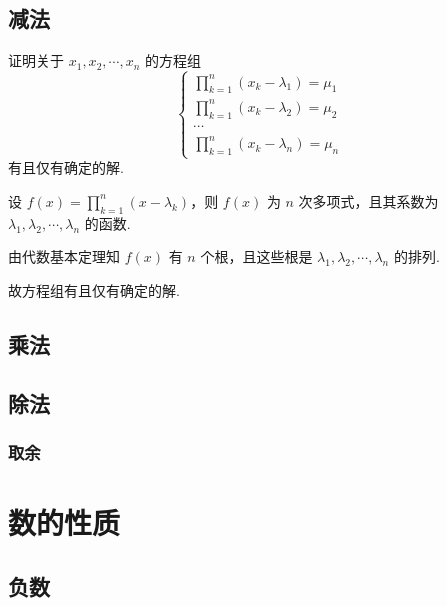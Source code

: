 \subsection{减法} \label{subsec:subtraction}

\begin{question}
  证明关于 $x_1, x_2, \cdots, x_n$ 的方程组
  \[
    \left\{
    \begin{gathered}
      \prod_{k = 1}^{n} (x_k - \lambda_1) = \mu_1 \\
      \prod_{k = 1}^{n} (x_k - \lambda_2) = \mu_2 \\
      \cdots                                      \\
      \prod_{k = 1}^{n} (x_k - \lambda_n) = \mu_n
    \end{gathered}
    \right.
  \]
  有且仅有确定的解.
\end{question}

\begin{solution}
  设 $f(x) = \prod_{k = 1}^{n} (x - \lambda_k)$，则 $f(x)$ 为 $n$ 次多项式，且其系数为 $\lambda_1, \lambda_2, \cdots, \lambda_n$ 的函数.

  由代数基本定理知 $f(x)$ 有 $n$ 个根，且这些根是 $\lambda_1, \lambda_2, \cdots, \lambda_n$ 的排列.

  故方程组有且仅有确定的解.
\end{solution}

\subsection{乘法} \label{subsec:multiplication}

\subsection{除法} \label{subsec:division}

\subsubsection{取余} \label{subsubsec:modulus}

\section{数的性质} \label{sec:number-properties}

\subsection{负数} \label{subsec:negative-number}

